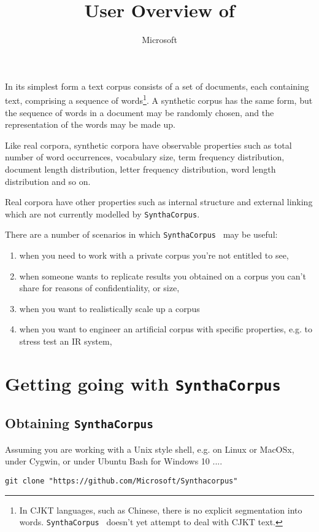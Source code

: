 \documentclass{article}
\title{User Overview of \projectName}
\author{Microsoft}
\newcommand{\projectName}{\texttt{SynthaCorpus}}
\begin{document}
\maketitle{}


In its simplest form a text corpus consists of a set of documents,
each containing text, comprising a sequence of words\footnote{In CJKT
  languages, such as Chinese, there is no explicit segmentation into
  words. \projectName~ doesn't yet attempt to deal with CJKT text.}.
A synthetic corpus has the same form, but the sequence of words in a
document may be randomly chosen, and the representation of the words
may be made up.

Like real corpora, synthetic corpora have observable properties such
as total number of word occurrences, vocabulary size, term frequency
distribution, document length distribution, letter frequency
distribution, word length distribution and so on.

Real corpora have other properties such as internal structure and
external linking which are not currently modelled by \projectName.

There are a number of scenarios in which \projectName~ may be useful:
\begin{enumerate}
  \item when you need to work with a private corpus you're
    not entitled to see,
  \item when someone wants to replicate results
    you obtained on a corpus you can't share  for reasons of
    confidentiality, or size,
  \item when you want to realistically scale up a corpus
  \item when you want to engineer an artificial corpus with 
    specific properties, e.g. to stress test an IR system,
\end{enumerate}

\section{Getting going with \projectName}

\subsection{Obtaining \projectName}

Assuming you are working with a Unix style shell, e.g. on Linux or MacOSx,
under Cygwin, or under Ubuntu Bash for Windows 10 ....

\begin{verbatim}
git clone "https://github.com/Microsoft/Synthacorpus"
\end{verbatim}
\end{document}
